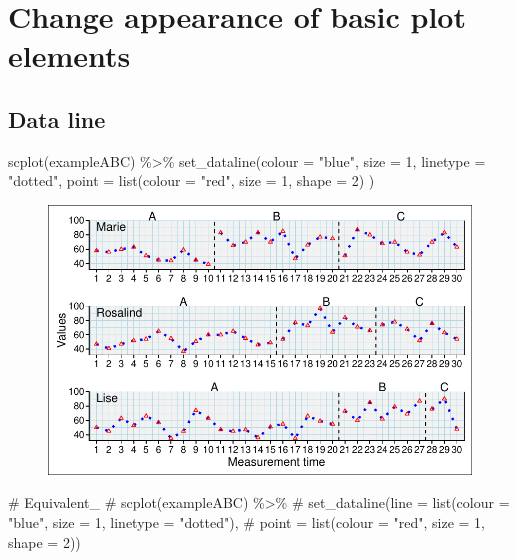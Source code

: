 \documentclass[
  letterpaper,
  DIV=11,
  numbers=noendperiod]{scrreprt}
\newenvironment{Shaded}{\begin{snugshade}}{\end{snugshade}}
\newcommand{\AttributeTok}[1]{\textcolor[rgb]{0.40,0.45,0.13}{#1}}
\newcommand{\CommentTok}[1]{\textcolor[rgb]{0.37,0.37,0.37}{#1}}
\newcommand{\DecValTok}[1]{\textcolor[rgb]{0.68,0.00,0.00}{#1}}
\newcommand{\FunctionTok}[1]{\textcolor[rgb]{0.28,0.35,0.67}{#1}}
\newcommand{\NormalTok}[1]{\textcolor[rgb]{0.00,0.23,0.31}{#1}}
\newcommand{\SpecialCharTok}[1]{\textcolor[rgb]{0.37,0.37,0.37}{#1}}
\newcommand{\StringTok}[1]{\textcolor[rgb]{0.13,0.47,0.30}{#1}}
\begin{document}
\hypertarget{change-appearance-of-basic-plot-elements}{%
\section{Change appearance of basic plot
elements}\label{change-appearance-of-basic-plot-elements}}

\hypertarget{data-line}{%
\subsection{Data line}\label{data-line}}

\begin{Shaded}
\begin{Highlighting}[]
\FunctionTok{scplot}\NormalTok{(exampleABC) }\SpecialCharTok{\%\textgreater{}\%}
  \FunctionTok{set\_dataline}\NormalTok{(}\AttributeTok{colour =} \StringTok{"blue"}\NormalTok{, }\AttributeTok{size =} \DecValTok{1}\NormalTok{, }\AttributeTok{linetype =} \StringTok{"dotted"}\NormalTok{, }
               \AttributeTok{point =} \FunctionTok{list}\NormalTok{(}\AttributeTok{colour =} \StringTok{"red"}\NormalTok{, }\AttributeTok{size =} \DecValTok{1}\NormalTok{, }\AttributeTok{shape =} \DecValTok{2}\NormalTok{) )}
\end{Highlighting}
\end{Shaded}

\begin{figure}[H]

{\centering \includegraphics{./ch_scplot_files/figure-pdf/line1-1.pdf}

}

\end{figure}

\begin{Shaded}
\begin{Highlighting}[]
\CommentTok{\# Equivalent\_}
\CommentTok{\# scplot(exampleABC) \%\textgreater{}\%}
\CommentTok{\#   set\_dataline(line = list(colour = "blue", size = 1, linetype = "dotted"), }
\CommentTok{\#                point = list(colour = "red", size = 1, shape = 2)) }
\end{Highlighting}
\end{Shaded}
\end{document}
